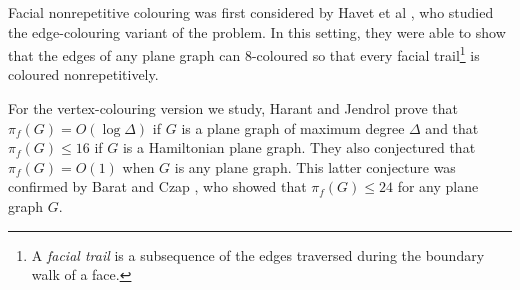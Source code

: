 \documentclass{patmorin}
\begin{document}
Facial nonrepetitive colouring was first considered by Havet et al
\cite{havet2011facial}, who studied the edge-colouring variant of
the problem.  In this setting, they were able to show that the edges
of any plane graph can 8-coloured so that every facial trail\footnote{A
\emph{facial trail} is a subsequence of the edges traversed during the
boundary walk of a face.} is coloured nonrepetitively. 

For the vertex-colouring version we study, Harant and Jendrol prove
that $\pi_f(G)=O(\log\Delta)$ if $G$ is a plane graph of maximum
degree $\Delta$ and that $\pi_f(G)\le 16$ if $G$ is a Hamiltonian
plane graph.  They also conjectured that $\pi_f(G)=O(1)$ when $G$ is
any plane graph.  This latter conjecture was confirmed by Barat and Czap
\cite{barat2007square}, who showed that $\pi_f(G)\le 24$ for any plane
graph $G$.


%
 
\end{document}
